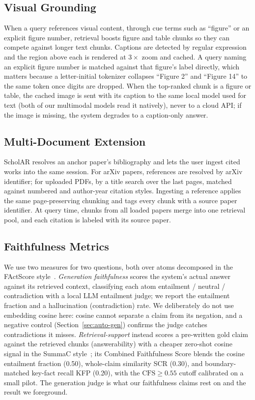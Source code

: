 \documentclass[letterpaper]{article} %
\begin{document}
\subsection{Visual Grounding}
When a query references visual content, through cue terms such as ``figure'' or an explicit
figure number, retrieval boosts figure and table chunks so they can compete against longer
text chunks. Captions are detected by regular expression and the region above each is rendered
at $3\times$ zoom and cached. A query naming an explicit figure number is matched against that
figure's label directly, which matters because a letter-initial tokenizer collapses ``Figure 2''
and ``Figure 14'' to the same token once digits are dropped. When the top-ranked chunk is a
figure or table, the cached image is sent with its caption to the same local model used for text
(both of our multimodal models read it natively), never to a cloud API; if the image is missing,
the system degrades to a caption-only answer.

\subsection{Multi-Document Extension}
ScholAR resolves an anchor paper's bibliography and lets the user ingest cited
works into the same session. For arXiv papers, references are resolved by arXiv
identifier; for uploaded PDFs, by a title search over the last pages, matched
against numbered and author-year citation styles. Ingesting a reference applies the
same page-preserving chunking and tags every chunk with a source paper identifier.
At query time, chunks from all loaded papers merge into one retrieval pool, and each
citation is labeled with its source paper.

\subsection{Faithfulness Metrics}
\label{sec:method-faith}
We use two measures for two questions, both over atoms decomposed in the FActScore
style~\citep{min2023factscore}. \emph{Generation faithfulness} scores the system's actual answer
against its retrieved context, classifying each atom entailment / neutral / contradiction with a
local LLM entailment judge; we report the entailment fraction and a hallucination (contradiction)
rate. We deliberately do not use embedding cosine here: cosine cannot separate a claim from its
negation, and a negative control (Section~\ref{sec:auto-gen}) confirms the judge catches
contradictions it misses. \emph{Retrieval-support} instead scores a pre-written gold claim against
the retrieved chunks (answerability) with a cheaper zero-shot cosine signal in the SummaC
style~\citep{laban2022summac}; its Combined Faithfulness Score blends the cosine entailment
fraction (0.50), whole-claim similarity SCR (0.30), and boundary-matched key-fact recall KFP
(0.20), with the $\mathrm{CFS}{\geq}0.55$ cutoff calibrated on a small pilot. The generation judge
is what our faithfulness claims rest on and the result we foreground.
\end{document}
